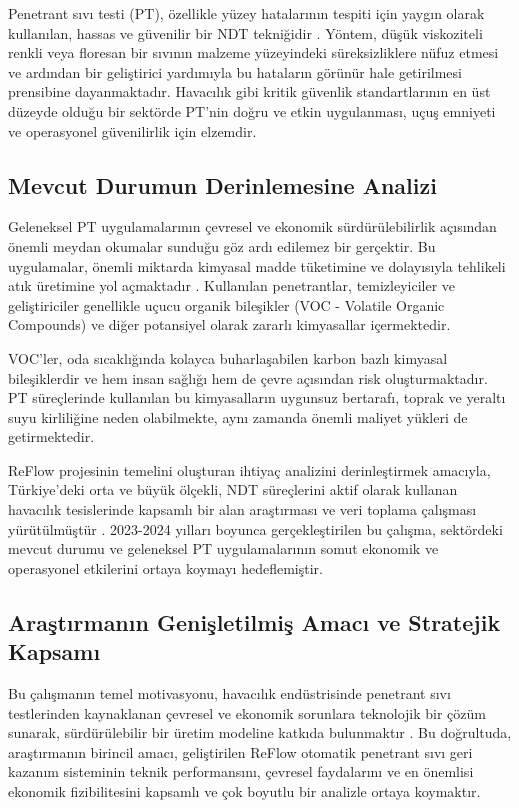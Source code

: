 \documentclass[12pt,a4paper]{article}
\begin{document}
Penetrant sıvı testi (PT), özellikle yüzey hatalarının tespiti için yaygın olarak kullanılan, hassas ve güvenilir bir NDT tekniğidir \cite{hellier2012handbook}. Yöntem, düşük viskoziteli renkli veya floresan bir sıvının malzeme yüzeyindeki süreksizliklere nüfuz etmesi ve ardından bir geliştirici yardımıyla bu hataların görünür hale getirilmesi prensibine dayanmaktadır. Havacılık gibi kritik güvenlik standartlarının en üst düzeyde olduğu bir sektörde PT'nin doğru ve etkin uygulanması, uçuş emniyeti ve operasyonel güvenilirlik için elzemdir.

\subsection{Mevcut Durumun Derinlemesine Analizi}

Geleneksel PT uygulamalarının çevresel ve ekonomik sürdürülebilirlik açısından önemli meydan okumalar sunduğu göz ardı edilemez bir gerçektir. Bu uygulamalar, önemli miktarda kimyasal madde tüketimine ve dolayısıyla tehlikeli atık üretimine yol açmaktadır \cite{epa2022industrial}. Kullanılan penetrantlar, temizleyiciler ve geliştiriciler genellikle uçucu organik bileşikler (VOC - Volatile Organic Compounds) ve diğer potansiyel olarak zararlı kimyasallar içermektedir.

VOC'ler, oda sıcaklığında kolayca buharlaşabilen karbon bazlı kimyasal bileşiklerdir ve hem insan sağlığı hem de çevre açısından risk oluşturmaktadır. PT süreçlerinde kullanılan bu kimyasalların uygunsuz bertarafı, toprak ve yeraltı suyu kirliliğine neden olabilmekte, aynı zamanda önemli maliyet yükleri de getirmektedir.

ReFlow projesinin temelini oluşturan ihtiyaç analizini derinleştirmek amacıyla, Türkiye'deki orta ve büyük ölçekli, NDT süreçlerini aktif olarak kullanan havacılık tesislerinde kapsamlı bir alan araştırması ve veri toplama çalışması yürütülmüştür \cite{garcia2019environmental}. 2023-2024 yılları boyunca gerçekleştirilen bu çalışma, sektördeki mevcut durumu ve geleneksel PT uygulamalarının somut ekonomik ve operasyonel etkilerini ortaya koymayı hedeflemiştir.

\subsection{Araştırmanın Genişletilmiş Amacı ve Stratejik Kapsamı}

Bu çalışmanın temel motivasyonu, havacılık endüstrisinde penetrant sıvı testlerinden kaynaklanan çevresel ve ekonomik sorunlara teknolojik bir çözüm sunarak, sürdürülebilir bir üretim modeline katkıda bulunmaktır \cite{icao2023environmental}. Bu doğrultuda, araştırmanın birincil amacı, geliştirilen ReFlow otomatik penetrant sıvı geri kazanım sisteminin teknik performansını, çevresel faydalarını ve en önemlisi ekonomik fizibilitesini kapsamlı ve çok boyutlu bir analizle ortaya koymaktır.
\end{document}
